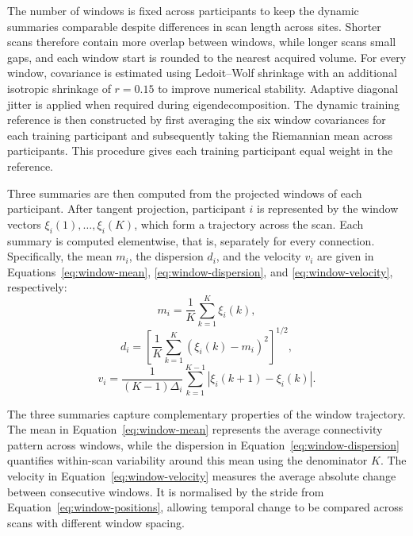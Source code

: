 The number of windows is fixed across participants to keep the dynamic summaries comparable
despite differences in scan length across sites. Shorter scans therefore contain more
overlap between windows, while longer scans  small gaps, and each window start
is rounded to the nearest acquired volume. For every window, covariance is estimated using
Ledoit--Wolf shrinkage with an additional isotropic shrinkage of $r=0.15$ to improve
numerical stability. Adaptive diagonal jitter is applied when required during
eigendecomposition. The dynamic training reference is then constructed by first averaging
the six window covariances for each training participant and subsequently taking the
Riemannian mean across participants. This procedure gives each training participant equal
weight in the reference.

Three summaries are then computed from the projected windows of each participant. After
tangent projection, participant $i$ is represented by the window vectors
$\xi_i(1),\ldots,\xi_i(K)$, which form a trajectory across the scan. Each summary is
computed elementwise, that is, separately for every connection. Specifically, the mean
$m_i$, the dispersion $d_i$, and the velocity $v_i$ are given in Equations~\eqref{eq:window-mean}, %
\eqref{eq:window-dispersion}, and \eqref{eq:window-velocity}, respectively:
\begin{equation}
m_i
=
\frac{1}{K}\sum_{k=1}^{K}\xi_i(k),
\label{eq:window-mean}
\end{equation}
\begin{equation}
d_i
=
\left[
\frac{1}{K}
\sum_{k=1}^{K}
\left(\xi_i(k)-m_i\right)^2
\right]^{1/2},
\label{eq:window-dispersion} %
\end{equation}
\begin{equation}
v_i
=
\frac{1}{(K-1)\Delta_i}
\sum_{k=1}^{K-1}
\left|\xi_i(k+1)-\xi_i(k)\right|.
\label{eq:window-velocity} %
\end{equation}

The three summaries capture complementary properties of the window trajectory. The mean in
Equation~\eqref{eq:window-mean} represents the average connectivity pattern across windows, while the
dispersion in Equation~\eqref{eq:window-dispersion} quantifies within-scan variability around this mean
using the denominator $K$. The velocity in Equation~\eqref{eq:window-velocity} measures the average
absolute change between consecutive windows. It is normalised by the stride from
Equation~\eqref{eq:window-positions}, allowing temporal change to be compared across scans with different
window spacing.

